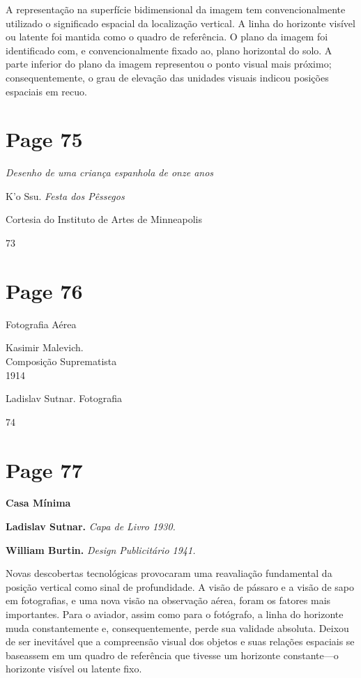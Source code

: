 \documentclass[a4paper]{article}
\begin{document}
A representação na superfície bidimensional da imagem tem convencionalmente utilizado o significado espacial da localização vertical. A linha do horizonte visível ou latente foi mantida como o quadro de referência. O plano da imagem foi identificado com, e convencionalmente fixado ao, plano horizontal do solo. A parte inferior do plano da imagem representou o ponto visual mais próximo; consequentemente, o grau de elevação das unidades visuais indicou posições espaciais em recuo.

\newpage
\section*{Page 75}

\textit{Desenho de uma criança espanhola de onze anos}

K'o Ssu. \textit{Festa dos Pêssegos}

Cortesia do Instituto de Artes de Minneapolis

73

\newpage
\section*{Page 76}

Fotografia Aérea

Kasimir Malevich.\\
Composição Suprematista\\
1914

Ladislav Sutnar. Fotografia

74

\newpage
\section*{Page 77}

\textbf{Casa Mínima}

\textbf{Ladislav Sutnar.} \textit{Capa de Livro 1930.}

\bigskip

\textbf{William Burtin.} \textit{Design Publicitário 1941.}

Novas descobertas tecnológicas provocaram uma reavaliação fundamental da posição vertical como sinal de profundidade. A visão de pássaro e a visão de sapo em fotografias, e uma nova visão na observação aérea, foram os fatores mais importantes. Para o aviador, assim como para o fotógrafo, a linha do horizonte muda constantemente e, consequentemente, perde sua validade absoluta. Deixou de ser inevitável que a compreensão visual dos objetos e suas relações espaciais se baseassem em um quadro de referência que tivesse um horizonte constante---o horizonte visível ou latente fixo.
\end{document}

